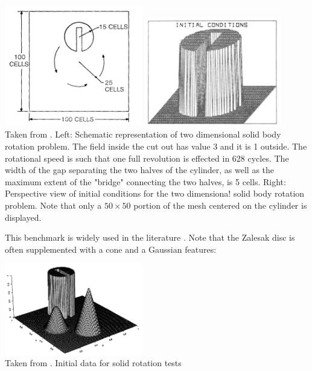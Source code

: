 \begin{center}
\includegraphics[width=6cm]{images/tracking/zale79a}
\includegraphics[width=6cm]{images/tracking/zale79b}\\
{\tiny Taken from \cite{zale79}. Left: Schematic representation of two dimensional 
solid body rotation problem. The field inside the cut out has value 3 and it is 1
outside. The rotational speed is such that one full revolution is effected in 
628 cycles. The width of the gap separating the two halves of the cylinder,
as well as the maximum extent of the "bridge" connecting the two halves, is 5 cells.
Right: Perspective view of initial conditions for the two dimensiona! solid body rotation
problem. Note that only a $50\times50$ portion of the mesh centered on the cylinder is displayed.}
\end{center}

This benchmark is widely used in the literature \cite{supu00,vasv05,dilp06,basd08,zhbl14}.
Note that the Zalesak disc is often supplemented with a cone and a Gaussian features:

\begin{center}
\includegraphics[width=6cm]{images/tracking/leve96}\\
{\tiny Taken from \cite{leve96}. Initial data for solid rotation tests}
\end{center}






